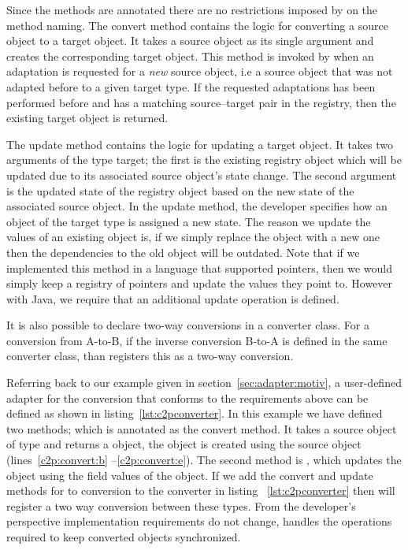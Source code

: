 Since the methods are annotated there are no restrictions imposed by \zamk on the method naming. 
The convert method contains the logic for converting a source object to a target object. It takes a source object as its single argument and creates the corresponding target object.
This method is invoked by \zamk when an adaptation is requested for a \emph{new} source object, i.e a source object that was not adapted before to a given target type. 
If the requested adaptations has been performed before and \zamk has a matching source--target pair in the registry, then the existing target object is returned.

The update method contains the logic for updating a target object. 
It takes two arguments of the type target; the first is the existing registry object which will be updated due to its associated source object's state change. 
The second argument is the updated state of the registry object based on the new state of the associated source object. 
In the update method, the developer specifies how an object of the target type is assigned a new state.
The reason we update the values of an existing object is, if we simply replace the object with a new one then the dependencies to the old object will be outdated. 
Note that if we implemented this method in a language that supported pointers, then we would simply keep a registry of pointers and update the values they point to. 
However with Java, we require that an additional update operation is defined.

It is also possible to declare two-way conversions in a converter class. 
For a conversion from A-to-B, if the inverse conversion B-to-A is defined in the same converter class, than \zamk registers this as a two-way conversion. 

Referring back to our example given in section~\ref{sec:adapter:motiv}, a user-defined adapter for the  conversion that conforms to the requirements above can be defined as shown in listing~\ref{lst:c2pconverter}. In this example we have defined two methods;  which is annotated as the convert method.
It takes a source object of type  and returns a  object, the  object is created using the source object (lines~\ref{c2p:convert:b} --\ref{c2p:convert:e}). 
The second method is , which updates the   object using the field values of the  object. 
If we add the convert and update methods for  to  conversion to the converter in listing~
\ref{lst:c2pconverter} then \zamk will register a two way conversion between these types.
From the developer's perspective implementation requirements do not change, \zamk handles the operations required to keep converted objects synchronized.

